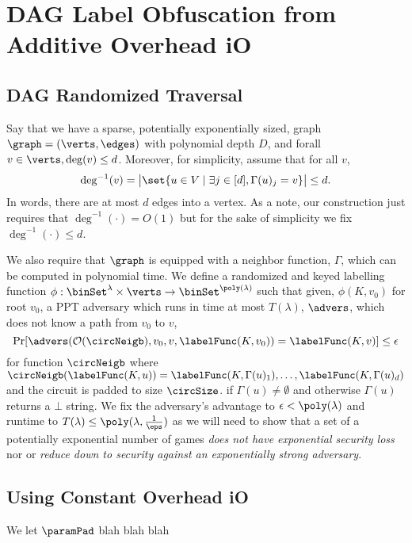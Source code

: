 \section{DAG Label Obfuscation from Additive Overhead iO}
\subsection{DAG Randomized Traversal}
Say that we have a sparse, potentially exponentially sized, graph $\graph = (\verts, \edges)$ with polynomial depth $D$,
and forall $v \in \verts, \deg(v) \leq d$. Moreover, for simplicity,
assume that for all $v$, 
$$
\deg^{-1}(v) = \big|\set{u \in V \mid \exists j \in [d], \Gamma(u)_j = v}\big| \leq d.
$$
In words, there are at most $d$ edges into a vertex. As a note, our construction just requires
that $\deg^{-1}(\cdot) = O(1)$ but for the sake of simplicity we fix $\deg^{-1}(\cdot) \leq d$.

We also require that $\graph$ is equipped with a neighbor function, $\Gamma$, which can be computed in polynomial time.
We define a randomized and keyed labelling function $\phi: \binSet^\lambda \times \verts \rightarrow \binSet^{\poly(\lambda)}$ 
such that given, $\phi(K, v_0)$ for root $v_0$, a PPT adversary which runs in time at most $T(\lambda)$, $\advers$, which does not know a path from $v_0$ to $v$,
\begin{equation}
	\label{eq:guessPhi}
	\Pr[\advers(\mathcal{O}(\circNeigb), v_0, v, \labelFunc(K, v_0)) = \labelFunc(K, v)] \leq \epsilon
\end{equation}
for function $\circNeigb$ where $\circNeigb(\labelFunc(K, u)) = \labelFunc(K, \Gamma(u)_1), \dots, \labelFunc(K, \Gamma(u)_d)$ and the circuit is padded to size $\circSize$.
if $\Gamma(u) \neq \emptyset$ and otherwise $\Gamma(u)$ returns a $\bot$ string.
We fix the adversary's advantage to $\epsilon < \poly(\lambda)$ and runtime to $T(\lambda) \leq \poly(\lambda, \frac{1}{\eps})$
as we will need to show
that a set of a potentially exponential number of games \emph{does not have exponential security loss}
nor or \emph{reduce down to security against an exponentially strong adversary}.

\subsection{Using Constant Overhead iO}
\label{def:constOverheadParam}

We let $\paramPad$ blah blah blah

